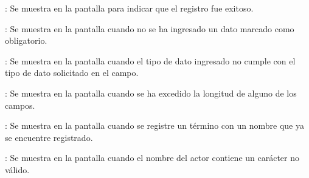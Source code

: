 \begin{Citemize}
	\item {}: Se muestra en la pantalla  para indicar que el registro fue exitoso.
	\item {}: Se muestra en la pantalla  cuando no se ha ingresado un dato marcado como obligatorio.
	\item {}: Se muestra en la pantalla  cuando el tipo de dato ingresado no cumple con el tipo de dato solicitado en el campo.
	\item {}: Se muestra en la pantalla  cuando se ha excedido la longitud de alguno de los campos.
	\item {}: Se muestra en la pantalla  cuando se registre un término con un nombre que ya se encuentre registrado.
	\item {}: Se muestra en la pantalla  cuando el nombre del actor contiene un carácter no válido.
\end{Citemize}
